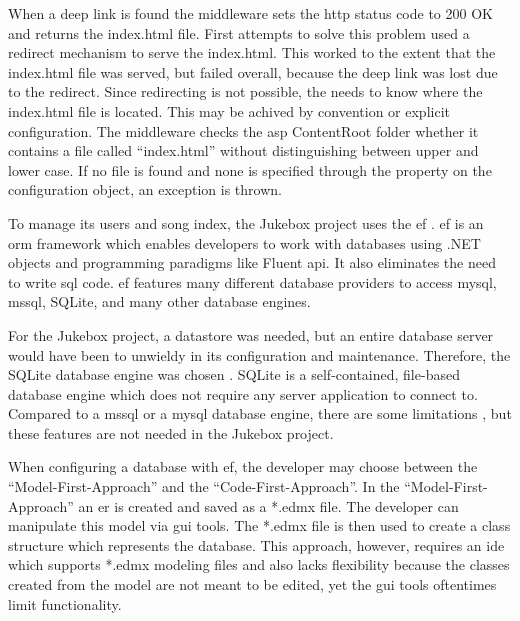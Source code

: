 When a deep link is found the middleware sets the \gls{http} status code to 200 OK and returns the index.html file. First attempts to solve this problem used a redirect mechanism to serve the index.html. This worked to the extent that the index.html file was served, but failed overall, because the deep link was lost due to the redirect. Since redirecting is not possible, the  needs to know where the index.html file is located. This may be achived by convention or explicit configuration. The middleware checks the \gls{asp} ContentRoot folder whether it contains a file called \enquote{index.html} without distinguishing between upper and lower case. If no file is found and none is specified through the  property on the configuration object, an exception is thrown.

\newpage




To manage its users and song index, the Jukebox project uses the \gls{ef} \cite{efCore}. \gls{ef} is an \gls{orm} framework which enables developers to work with databases using .NET objects and programming paradigms like Fluent \gls{api}. It also eliminates the need to write \gls{sql} code. \gls{ef} features many different database providers to access \gls{mysql}, \gls{mssql}, SQLite, and many other database engines.

For the Jukebox project, a datastore was needed, but an entire database server would have been to unwieldy in its configuration and maintenance. Therefore, the SQLite database engine was chosen \cite{sqlite}. SQLite is a self-contained, file-based database engine which does not require any server application to connect to. Compared to a \gls{mssql} or a \gls{mysql} database engine, there are some limitations \cite{sqliteLimitations}, but these features are not needed in the Jukebox project.


When configuring a database with \gls{ef}, the developer may choose between the \enquote{Model-First-Approach} and the \enquote{Code-First-Approach}. In the \enquote{Model-First-Approach} an \gls{er} is created and saved as a *.edmx file. The developer can manipulate this model via \gls{gui} tools. The *.edmx file is then used to create a class structure which represents the database. This approach, however, requires an \gls{ide} which supports *.edmx modeling files and also lacks flexibility because the classes created from the model are not meant to be edited, yet the \gls{gui} tools oftentimes limit functionality.

